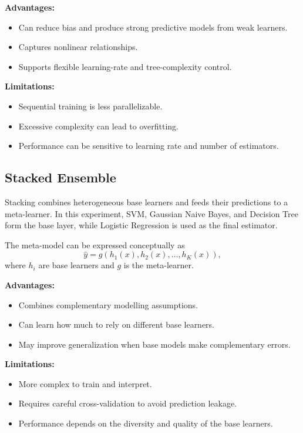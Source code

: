 \documentclass[12pt,a4paper]{article}
\begin{document}
\textbf{Advantages:}
\begin{itemize}
\item Can reduce bias and produce strong predictive models from weak learners.
\item Captures nonlinear relationships.
\item Supports flexible learning-rate and tree-complexity control.
\end{itemize}

\textbf{Limitations:}
\begin{itemize}
\item Sequential training is less parallelizable.
\item Excessive complexity can lead to overfitting.
\item Performance can be sensitive to learning rate and number of estimators.
\end{itemize}

\subsection{Stacked Ensemble}
Stacking combines heterogeneous base learners and feeds their predictions to a meta-learner. In this experiment, SVM, Gaussian Naive Bayes, and Decision Tree form the base layer, while Logistic Regression is used as the final estimator.

The meta-model can be expressed conceptually as
\[
\hat{y}=g\left(h_1(x),h_2(x),\ldots,h_K(x)\right),
\]
where $h_i$ are base learners and $g$ is the meta-learner.

\textbf{Advantages:}
\begin{itemize}
\item Combines complementary modelling assumptions.
\item Can learn how much to rely on different base learners.
\item May improve generalization when base models make complementary errors.
\end{itemize}

\textbf{Limitations:}
\begin{itemize}
\item More complex to train and interpret.
\item Requires careful cross-validation to avoid prediction leakage.
\item Performance depends on the diversity and quality of the base learners.
\end{itemize}
\end{document}
